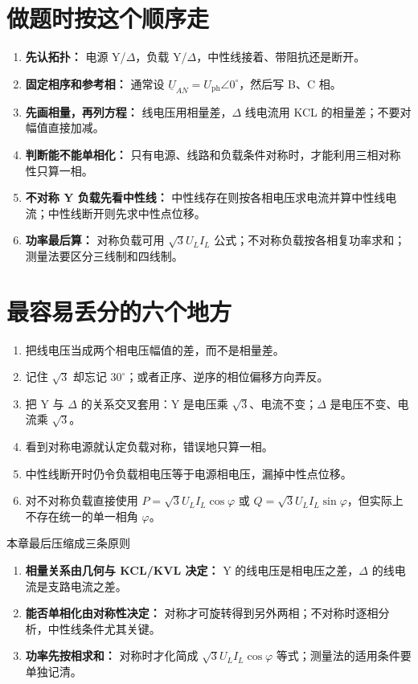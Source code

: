\documentclass[circuit]{CarlosTexRpt}
\newcommand{\phas}[1]{\underline{#1}}
\begin{document}
\section{做题时按这个顺序走}

\begin{enumerate}[leftmargin=2.2em,itemsep=.3em]
  \item \textbf{先认拓扑：} 电源 Y/\(\Delta\)，负载 Y/\(\Delta\)，中性线接着、带阻抗还是断开。
  \item \textbf{固定相序和参考相：} 通常设 \(\phas U_{AN}=U_{\mathrm{ph}}\angle0^\circ\)，然后写 B、C 相。
  \item \textbf{先画相量，再列方程：} 线电压用相量差，\(\Delta\) 线电流用 KCL 的相量差；不要对幅值直接加减。
  \item \textbf{判断能不能单相化：} 只有电源、线路和负载条件对称时，才能利用三相对称性只算一相。
  \item \textbf{不对称 Y 负载先看中性线：} 中性线存在则按各相电压求电流并算中性线电流；中性线断开则先求中性点位移。
  \item \textbf{功率最后算：} 对称负载可用 \(\sqrt3 U_LI_L\) 公式；不对称负载按各相复功率求和；测量法要区分三线制和四线制。
\end{enumerate}

\section{最容易丢分的六个地方}

\begin{enumerate}[leftmargin=2.2em,itemsep=.25em]
  \item 把线电压当成两个相电压幅值的差，而不是相量差。
  \item 记住 \(\sqrt3\) 却忘记 \(30^\circ\)；或者正序、逆序的相位偏移方向弄反。
  \item 把 Y 与 \(\Delta\) 的关系交叉套用：Y 是电压乘 \(\sqrt3\)、电流不变；\(\Delta\) 是电压不变、电流乘 \(\sqrt3\)。
  \item 看到对称电源就认定负载对称，错误地只算一相。
  \item 中性线断开时仍令负载相电压等于电源相电压，漏掉中性点位移。
  \item 对不对称负载直接使用 \(P=\sqrt3 U_LI_L\cos\varphi\) 或 \(Q=\sqrt3 U_LI_L\sin\varphi\)，但实际上不存在统一的单一相角 \(\varphi\)。
\end{enumerate}

\begin{keybox}{本章最后压缩成三条原则}
\begin{enumerate}[leftmargin=2em,itemsep=.25em]
  \item \textbf{相量关系由几何与 KCL/KVL 决定：} Y 的线电压是相电压之差，\(\Delta\) 的线电流是支路电流之差。
  \item \textbf{能否单相化由对称性决定：} 对称才可旋转得到另外两相；不对称时逐相分析，中性线条件尤其关键。
  \item \textbf{功率先按相求和：} 对称时才化简成 \(\sqrt3 U_LI_L\cos\varphi\) 等式；测量法的适用条件要单独记清。
\end{enumerate}
\end{keybox}
\end{document}
